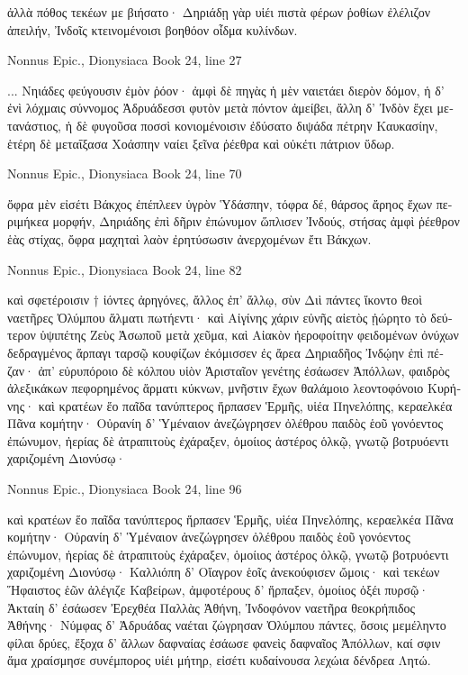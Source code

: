 \documentclass[12pt,letterpaper,twoside,final]{memoir}
\begin{document}
\begin{greek}
ἀλλὰ πόθος τεκέων με βιήσατο· Δηριάδῃ γὰρ 
υἱέι πιστὰ φέρων ῥοθίων ἐλέλιζον ἀπειλήν, 
Ἰνδοῖς κτεινομένοισι βοηθόον οἶδμα κυλίνδων. 



Nonnus Epic., Dionysiaca 
Book 24, line 27

                                                    ... 
Νηιάδες φεύγουσιν ἐμὸν ῥόον· ἀμφὶ δὲ πηγὰς 
ἡ μὲν ναιετάει διερὸν δόμον, ἡ δ' ἐνὶ λόχμαις 
σύννομος Ἀδρυάδεσσι φυτὸν μετὰ πόντον ἀμείβει, 
ἄλλη δ' Ἰνδὸν ἔχει μετανάστιος, ἡ δὲ φυγοῦσα 
ποσσὶ κονιομένοισιν ἐδύσατο διψάδα πέτρην 
Καυκασίην, ἑτέρη δὲ μεταΐξασα Χοάσπην 
ναίει ξεῖνα ῥέεθρα καὶ οὐκέτι πάτριον ὕδωρ. 



Nonnus Epic., Dionysiaca 
Book 24, line 70

ὄφρα μὲν εἰσέτι Βάκχος ἐπέπλεεν ὑγρὸν Ὑδάσπην, 
τόφρα δέ, θάρσος ἄρηος ἔχων περιμήκεα μορφήν, 
Δηριάδης ἐπὶ δῆριν ἐπώνυμον ὥπλισεν Ἰνδούς, 
στήσας ἀμφὶ ῥέεθρον ἑὰς στίχας, ὄφρα μαχηταὶ 
λαὸν ἐρητύσωσιν ἀνερχομένων ἔτι Βάκχων. 



Nonnus Epic., Dionysiaca 
Book 24, line 82

καὶ σφετέροισιν † ἰόντες ἀρηγόνες, ἄλλος ἐπ' ἄλλῳ, 
σὺν Διὶ πάντες ἵκοντο θεοὶ ναετῆρες Ὀλύμπου 
ἅλματι πωτήεντι· καὶ Αἰγίνης χάριν εὐνῆς 
αἰετὸς ᾐώρητο τὸ δεύτερον ὑψιπέτης Ζεὺς 
Ἀσωποῦ μετὰ χεῦμα, καὶ Αἰακὸν ἠεροφοίτην 
φειδομένων ὀνύχων δεδραγμένος ἅρπαγι ταρσῷ 
κουφίζων ἐκόμισσεν ἐς ἄρεα Δηριαδῆος 
Ἰνδῴην ἐπὶ πέζαν· ἀπ' εὐρυπόροιο δὲ κόλπου 
υἱὸν Ἀρισταῖον γενέτης ἐσάωσεν Ἀπόλλων, 
φαιδρὸς ἀλεξικάκων πεφορημένος ἅρματι κύκνων, 
μνῆστιν ἔχων θαλάμοιο λεοντοφόνοιο Κυρήνης· 
καὶ κρατέων ἕο παῖδα τανύπτερος ἥρπασεν Ἑρμῆς, 
υἱέα Πηνελόπης, κεραελκέα Πᾶνα κομήτην· 
Οὐρανίη δ' Ὑμέναιον ἀνεζώγρησεν ὀλέθρου   
παιδὸς ἑοῦ γονόεντος ἐπώνυμον, ἠερίας δὲ 
ἀτραπιτοὺς ἐχάραξεν, ὁμοίιος ἀστέρος ὁλκῷ, 
γνωτῷ βοτρυόεντι χαριζομένη Διονύσῳ· 




Nonnus Epic., Dionysiaca 
Book 24, line 96

καὶ κρατέων ἕο παῖδα τανύπτερος ἥρπασεν Ἑρμῆς, 
υἱέα Πηνελόπης, κεραελκέα Πᾶνα κομήτην· 
Οὐρανίη δ' Ὑμέναιον ἀνεζώγρησεν ὀλέθρου   
παιδὸς ἑοῦ γονόεντος ἐπώνυμον, ἠερίας δὲ 
ἀτραπιτοὺς ἐχάραξεν, ὁμοίιος ἀστέρος ὁλκῷ, 
γνωτῷ βοτρυόεντι χαριζομένη Διονύσῳ· 
Καλλιόπη δ' Οἴαγρον ἑοῖς ἀνεκούφισεν ὤμοις· 
καὶ τεκέων Ἥφαιστος ἑῶν ἀλέγιζε Καβείρων, 
ἀμφοτέρους δ' ἥρπαξεν, ὁμοίιος ὀξέι πυρσῷ· 
Ἀκταίη δ' ἐσάωσεν Ἐρεχθέα Παλλὰς Ἀθήνη, 
Ἰνδοφόνον ναετῆρα θεοκρήπιδος Ἀθήνης· 
Νύμφας δ' Ἀδρυάδας ναέται ζώγρησαν Ὀλύμπου 
πάντες, ὅσοις μεμέληντο φίλαι δρύες, ἔξοχα δ' ἄλλων 
δαφναίας ἐσάωσε φανεὶς δαφναῖος Ἀπόλλων, 
καί σφιν ἅμα χραίσμησε συνέμπορος υἱέι μήτηρ, 
εἰσέτι κυδαίνουσα λεχώια δένδρεα Λητώ. 




\end{greek}
\end{document}
